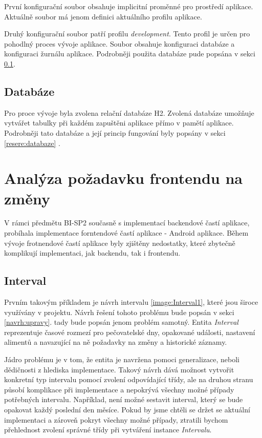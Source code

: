         První konfigurační soubor obsahuje implicitní proměnné pro prostředí aplikace. Aktuálně soubor má jenom definici aktuálního profilu aplikace. 
    
        Druhý konfigurační soubor patří profilu \textit{development}. Tento profil je určen pro pohodlný proces vývoje aplikace. Soubor obsahuje konfiguraci databáze a konfiguraci žurnálu aplikace. Podrobněji použita databáze pude popsána v sekci \ref{analyza:soucasnaImplementace:databaze}.
        
    \subsection{Databáze}\label{analyza:soucasnaImplementace:databaze}
        Pro proce vývoje byla zvolena relační databáze H2. Zvolená databáze umožňuje vytvářet tabulky při každém zapuštěni aplikace přímo v pamětí aplikace. Podrobněji tato databáze a její princip fungování byly popsány v sekci \ref{resere:databaze} .
    
\section{Analýza požadavku frontendu na změny}\label{analyza:pozadavky-frontendu}
    V rámci předmětu BI-SP2 současně s implementací backendové častí aplikace, probíhala implementace forntendové častí aplikace - Android aplikace. Během vývoje frotnendové častí aplikace byly zjištěny nedostatky, které zbytečně komplikují implementaci, jak backendu, tak i frontendu.
    
    \subsection{Interval}
        Prvním takovým příkladem je návrh intervalu \ref{image:Interval1}, které jsou široce využívány v projektu. Návrh řešení tohoto problému bude popsán v sekci \ref{navrh:upravy}. tady bude popsán jenom problém samotný. Entita \textit{Interval} reprezentuje časové rozmezí pro pečovatelské dny, opakované události, nastavení alimentů a navazující na ně požadavky na změny a historické záznamy.
            
        Jádro problému je v tom, že entita je navržena pomoci generalizace, neboli dědičnosti z hlediska implementace. Takový návrh dává možnost vytvořit konkretní typ intervalu pomocí zvolení odpovídající třídy, ale na druhou stranu působí komplikace při implementace a nepokrývá všechny možné případy potřebných intervalu. Například, není možné sestavit interval, který se bude opakovat každý poslední den měsíce. Pokud by jsme chtěli se držet se aktuální implementaci a zároveň pokryt všechny možné případy, ztratili bychom přehlednost zvolení správné třídy při vytváření instance \textit{Intervalu}.
            
